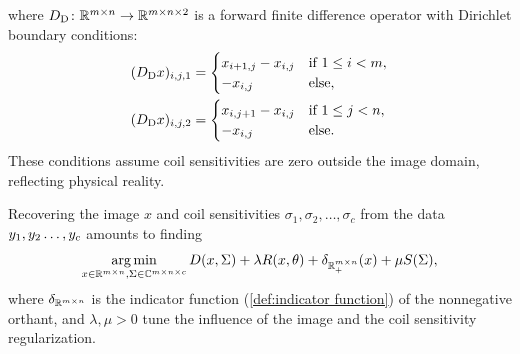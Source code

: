 where \( D_{\mathrm{D}} \colon \mathbb{R}^{m\times n} \to \mathbb{R}^{m\times n \times \num{2}} \) is a forward finite difference operator with Dirichlet boundary conditions:
\begin{equation}
	\begin{aligned}
		(D_{\mathrm{D}} x)_{i, j, \num{1}} &= \begin{cases}
			x_{i + \num{1}, j} - x_{i, j} & \text{if}\ \num{1} \leq i < m, \\
			-x_{i, j} & \text{else},
		\end{cases}\\
			(D_{\mathrm{D}} x)_{i, j, \num{2}} &= \begin{cases}
			x_{i,j + \num{1}} - x_{i,j} & \text{if}\ \num{1} \leq j < n, \\
			-x_{i, j} & \text{else}.
		\end{cases}
	\end{aligned}
\end{equation}
These conditions assume coil sensitivities are zero outside the image domain, reflecting physical reality.

Recovering the image \( x \) and coil sensitivities \( \sigma_{\num{1}}, \sigma_{\num{2}}, \dotsc, \sigma_c \) from the data \( y_{\num{1}}, y_{\num{2}} \dotsc, y_c \) amounts to finding
\begin{equation}
	\operatorname*{arg\,min}_{x \in \mathbb{R}^{m \times n}, \Sigma \in \mathbb{C}^{m \times n \times c}} D(x, \Sigma) + \lambda R(x, \theta) + \delta_{\mathbb{R}^{m\times n}_+}(x) + \mu S(\Sigma),
	\label{eq:joint inversion optimization problem}
\end{equation}
where \( \delta_{\mathbb{R}^{m\times n}} \) is the indicator function (\cref{def:indicator function}) of the nonnegative orthant, and \( \lambda, \mu > \num{0} \) tune the influence of the image and the coil sensitivity regularization.

